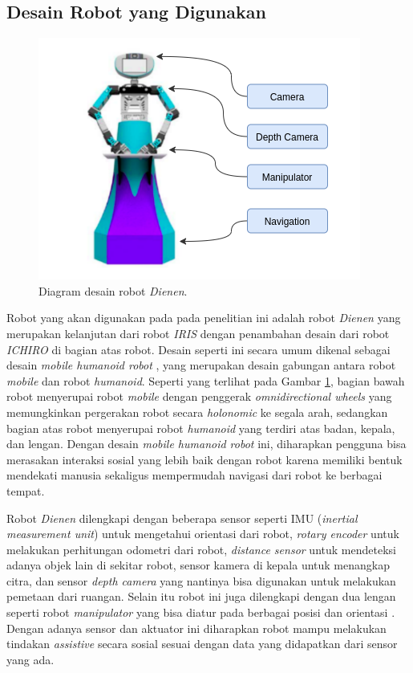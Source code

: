 \subsection{Desain Robot yang Digunakan}
\label{subsec:desainrobot}

\begin{figure} [ht]
  \centering
  \includegraphics[scale=0.6]{gambar/desainrobot.png}
  \caption{Diagram desain robot \emph{Dienen}.}
  \label{fig:desainrobot}
\end{figure}

Robot yang akan digunakan pada pada penelitian ini adalah robot \emph{Dienen} yang merupakan kelanjutan dari robot \emph{IRIS} \citep{dikairono2020}\citep{zanuar2019} dengan penambahan desain dari robot \emph{ICHIRO} \citep{muhtadin2019} di bagian atas robot.
Desain seperti ini secara umum dikenal sebagai desain \emph{mobile humanoid robot} \citep{mohamed2012}, yang merupakan desain gabungan antara robot \emph{mobile} dan robot \emph{humanoid}.
Seperti yang terlihat pada Gambar \ref{fig:desainrobot}, bagian bawah robot menyerupai robot \emph{mobile} dengan penggerak \emph{omnidirectional wheels} yang memungkinkan pergerakan robot secara \emph{holonomic} ke segala arah\citep{oliveira2008}, sedangkan bagian atas robot menyerupai robot \emph{humanoid} yang terdiri atas badan, kepala, dan lengan.
Dengan desain \emph{mobile humanoid robot} ini, diharapkan pengguna bisa merasakan interaksi sosial yang lebih baik dengan robot karena memiliki bentuk mendekati manusia \citep{rossi2018} sekaligus mempermudah navigasi dari robot ke berbagai tempat.

Robot \emph{Dienen} dilengkapi dengan beberapa sensor seperti IMU (\emph{inertial measurement unit}) untuk mengetahui orientasi dari robot, \emph{rotary encoder} untuk melakukan perhitungan odometri dari robot, \emph{distance sensor} untuk mendeteksi adanya objek lain di sekitar robot, sensor kamera di kepala untuk menangkap citra, dan sensor \emph{depth camera} yang nantinya bisa digunakan untuk melakukan pemetaan dari ruangan.
Selain itu robot ini juga dilengkapi dengan dua lengan seperti robot \emph{manipulator} yang bisa diatur pada berbagai posisi dan orientasi \citep{iqbal2012}.
Dengan adanya sensor dan aktuator ini diharapkan robot mampu melakukan tindakan \emph{assistive} secara sosial sesuai dengan data yang didapatkan dari sensor yang ada.
